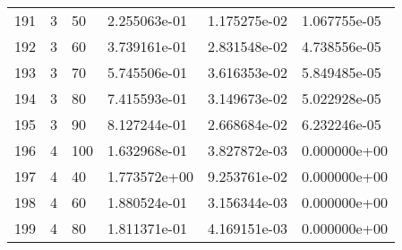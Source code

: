 \documentclass{article}
\begin{document}
\begin{center}
\begin{tabular}{llllll}
191 &         3 &         50 &  2.255063e-01 &          1.175275e-02 &                      1.067755e-05 \\
192 &         3 &         60 &  3.739161e-01 &          2.831548e-02 &                      4.738556e-05 \\
193 &         3 &         70 &  5.745506e-01 &          3.616353e-02 &                      5.849485e-05 \\
194 &         3 &         80 &  7.415593e-01 &          3.149673e-02 &                      5.022928e-05 \\
195 &         3 &         90 &  8.127244e-01 &          2.668684e-02 &                      6.232246e-05 \\
196 &         4 &        100 &  1.632968e-01 &          3.827872e-03 &                      0.000000e+00 \\
197 &         4 &         40 &  1.773572e+00 &          9.253761e-02 &                      0.000000e+00 \\
198 &         4 &         60 &  1.880524e-01 &          3.156344e-03 &                      0.000000e+00 \\
199 &         4 &         80 &  1.811371e-01 &          4.169151e-03 &                      0.000000e+00 \\
\bottomrule
\end{tabular}
\end{center}
\end{document}
